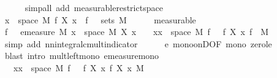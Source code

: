 \begin{isabellebody}
\ \ \ \ \isamarkupfalse%
\ {\isacharparenleft}{\kern0pt}simp{\isacharunderscore}{\kern0pt}all\ add{\isacharcolon}{\kern0pt}\ measurable{\isacharunderscore}{\kern0pt}restrict{\isacharunderscore}{\kern0pt}space{}{\isacharparenright}{\kern0pt}\isanewline
\ \ \ \ \isamarkupfalse%
\isanewline
\ \ \isamarkupfalse%
\ \isamarkupfalse%
\ {\isachardoublequoteopen}{\isacharbraceleft}{\kern0pt}x\ {\isasymin}\ space\ M{\isachardot}{\kern0pt}\ f\ {\isacharparenleft}{\kern0pt}X\ x{\isacharparenright}{\kern0pt}\ {\isasymge}\ f\ {\isasymepsilon}{\isacharbraceright}{\kern0pt}\ {\isasymin}\ sets\ M{\isachardoublequoteclose}\isanewline
\ \ \ \ \isamarkupfalse%
\ measurable\isanewline
\ \ \isamarkupfalse%
\ \isamarkupfalse%
\ {\isachardoublequoteopen}f\ {\isasymepsilon}\ {\isacharasterisk}{\kern0pt}\ emeasure\ M\ {\isacharbraceleft}{\kern0pt}x\ {\isasymin}\ space\ M{\isachardot}{\kern0pt}\ X\ x\ {\isasymge}\ {\isasymepsilon}{\isacharbraceright}{\kern0pt}\ {\isasymle}\ {\isasymintegral}\isactrlsup {\isacharplus}{\kern0pt}x{\isasymin}{\isacharbraceleft}{\kern0pt}x\ {\isasymin}\ space\ M{\isachardot}{\kern0pt}\ f\ {\isasymepsilon}\ {\isasymle}\ f\ {\isacharparenleft}{\kern0pt}X\ x{\isacharparenright}{\kern0pt}{\isacharbraceright}{\kern0pt}{\isachardot}{\kern0pt}\ f\ {\isasymepsilon}\ {\isasympartial}M{\isachardoublequoteclose}\isanewline
\ \ \ \ \isamarkupfalse%
\ {\isacharparenleft}{\kern0pt}simp\ add{\isacharcolon}{\kern0pt}\ nn{\isacharunderscore}{\kern0pt}integral{\isacharunderscore}{\kern0pt}cmult{\isacharunderscore}{\kern0pt}indicator{\isacharparenright}{\kern0pt}\isanewline
\ \ \ \ \isamarkupfalse%
\ e\ mono{\isacharunderscore}{\kern0pt}onD{\isacharbrackleft}{\kern0pt}OF\ mono{\isacharbrackright}{\kern0pt}\ zero{\isacharunderscore}{\kern0pt}le\ \isamarkupfalse%
\ {\isacharparenleft}{\kern0pt}blast\ intro{\isacharcolon}{\kern0pt}\ mult{\isacharunderscore}{\kern0pt}left{\isacharunderscore}{\kern0pt}mono\ emeasure{\isacharunderscore}{\kern0pt}mono{\isacharparenright}{\kern0pt}\isanewline
\ \ \ \ \isamarkupfalse%
\isanewline
\ \ \isamarkupfalse%
\ \isamarkupfalse%
\ {\isachardoublequoteopen}{\isachardot}{\kern0pt}{\isachardot}{\kern0pt}{\isachardot}{\kern0pt}\ {\isasymle}\ {\isasymintegral}\isactrlsup {\isacharplus}{\kern0pt}x{\isasymin}{\isacharbraceleft}{\kern0pt}x\ {\isasymin}\ space\ M{\isachardot}{\kern0pt}\ f\ {\isasymepsilon}\ {\isasymle}\ f\ {\isacharparenleft}{\kern0pt}X\ x{\isacharparenright}{\kern0pt}{\isacharbraceright}{\kern0pt}{\isachardot}{\kern0pt}\ f\ {\isacharparenleft}{\kern0pt}X\ x{\isacharparenright}{\kern0pt}\ {\isasympartial}M{\isachardoublequoteclose}\isanewline

\end{isabellebody}
